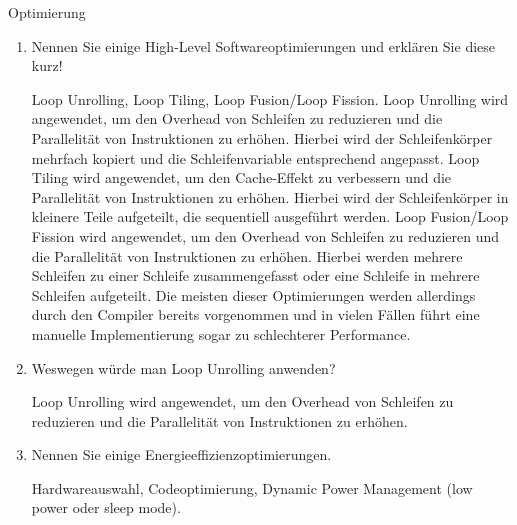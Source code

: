 \documentclass{article}
\begin{document}
\begin{exercise}{Optimierung}
  \begin{enumerate}
    \item Nennen Sie einige High-Level Softwareoptimierungen und erklären Sie diese kurz!

          \begin{solution}
            Loop Unrolling, Loop Tiling, Loop Fusion/Loop Fission.
            Loop Unrolling wird angewendet, um den Overhead von Schleifen zu reduzieren und die Parallelität von Instruktionen zu erhöhen. Hierbei wird der Schleifenkörper mehrfach kopiert und die Schleifenvariable entsprechend angepasst.
            Loop Tiling wird angewendet, um den Cache-Effekt zu verbessern und die Parallelität von Instruktionen zu erhöhen. Hierbei wird der Schleifenkörper in kleinere Teile aufgeteilt, die sequentiell ausgeführt werden.
            Loop Fusion/Loop Fission wird angewendet, um den Overhead von Schleifen zu reduzieren und die Parallelität von Instruktionen zu erhöhen. Hierbei werden mehrere Schleifen zu einer Schleife zusammengefasst oder eine Schleife in mehrere Schleifen aufgeteilt.
            Die meisten dieser Optimierungen werden allerdings durch den Compiler bereits vorgenommen und in vielen Fällen führt eine manuelle Implementierung sogar zu schlechterer Performance.

          \end{solution}

    \item Weswegen würde man Loop Unrolling anwenden?

          \begin{solution}
            Loop Unrolling wird angewendet, um den Overhead von Schleifen zu reduzieren und die Parallelität von Instruktionen zu erhöhen.
          \end{solution}

    \item Nennen Sie einige Energieeffizienzoptimierungen.

          \begin{solution}
            Hardwareauswahl, Codeoptimierung, Dynamic Power Management (low power oder sleep mode).
          \end{solution}
  \end{enumerate}
\end{exercise}
\end{document}

